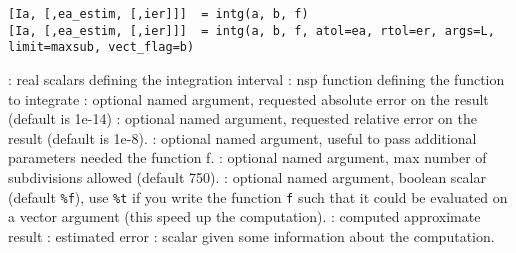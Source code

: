 
\begin{mandesc}
\end{mandesc}

\begin{calling_sequence}
\begin{verbatim}
[Ia, [,ea_estim, [,ier]]]  = intg(a, b, f)
[Ia, [,ea_estim, [,ier]]]  = intg(a, b, f, atol=ea, rtol=er, args=L,
limit=maxsub, vect_flag=b)
\end{verbatim}
\end{calling_sequence}
\begin{parameters}
  \begin{varlist}
    :  real scalars defining the integration interval
    : nsp function defining the function to integrate
    : optional named argument, requested absolute error
                      on the result (default is 1e-14)
    : optional named argument, requested relative error
                      on the result (default is 1e-8).
    : optional named argument, useful to pass
    additional parameters needed the function f.
    : optional named argument, max number of
    subdivisions allowed (default 750).
    : optional named argument, boolean scalar
    (default \verb+%f+), use \verb+%t+ if you write the function
                   \verb+f+ such that it could be evaluated on a
                   vector argument (this speed up the computation).
    : computed approximate result
    : estimated error
    : scalar given some information about the computation.
  \end{varlist}
\end{parameters}

